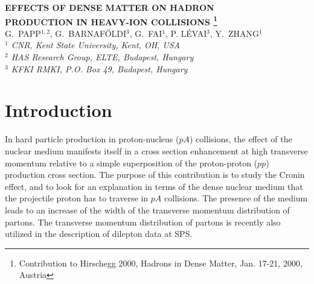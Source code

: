 \begin{center}
   {\large \bf EFFECTS OF DENSE MATTER ON HADRON}\\[2mm]
   {\large \bf PRODUCTION IN HEAVY-ION COLLISIONS
\renewcommand{\thefootnote}{\fnsymbol{footnote}}\setcounter{footnote}{2}%
\footnote{Contribution to Hirschegg 2000, Hadrons in Dense Matter, Jan. 17-21, 2000, Austria}}\\[5mm]
   G.~PAPP$^{1,2}$, G.~BARNAF\"OLDI$^3$, G.~FAI$^1$, P. L\'EVAI$^3$, Y.~ZHANG$^1$ \\[5mm]
   {\small \it  $^1$ CNR, Kent State University, Kent, OH, USA \\
                $^2$ HAS Research Group, ELTE, Budapest, Hungary \\
                $^3$ KFKI RMKI, P.O. Box 49, Budapest, Hungary \\[8mm] }
\end{center}

\begin{abstract}\noindent
The intrinsic transverse momentum distribution of partons in the
nucleon can be used to explain a large amount of high-$p_T$ hadron and
photon production data in high-energy nucleon-nucleon collisions at
energies $\sqrt{s} \approx 20$ to $1800$ GeV. However, proton-nucleus
experiments at energies $\approx 30$ GeV show an extra enhancement 
(Cronin effect) in the yield of photons and mesons
compared to a simple extrapolation of the proton-proton data. This
enhancement is due to the effect of the dense hadronic matter
encountered by the projectile proton in
the nuclear environment. We discuss the origin and the properties of 
the nuclear enhancement. 
\end{abstract}

\section{Introduction}

In hard particle production in proton-nucleus ($pA$) collisions,
the effect of the nuclear medium manifests itself in a cross section
enhancement at high transverse momentum relative to a simple 
superposition of the proton-proton ($pp$) production cross
section\cite{antreasyan79}. The purpose of this contribution is 
to study the Cronin effect, and to look for an
explanation in terms of the dense nuclear medium
that the projectile proton has to traverse in $pA$ collisions. 
The presence of the medium leads to an increase of the width
of the transverse momentum distribution of partons. The transverse 
momentum distribution of partons is recently also utilized 
in the description of dilepton data at SPS\cite{kampfer00}.  


